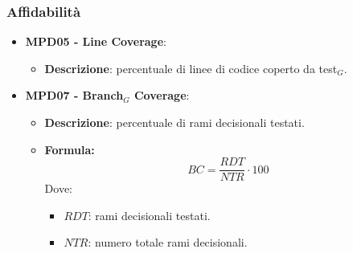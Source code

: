 \documentclass[10pt]{article}
\begin{document}
\begin{justify}
\subsubsection{Affidabilità}
\begin{itemize}
    \item \textbf{MPD05 - Line Coverage}:
    \begin{itemize}
        \item \textbf{Descrizione}: percentuale di linee di codice coperto da test$_G$.
    \end{itemize}

    \item \textbf{MPD07 - Branch$_G$ Coverage}:
    \begin{itemize}
        \item   \textbf{Descrizione}: percentuale di rami decisionali testati.
        \item   \textbf{Formula:}
            \[
            BC = \frac{RDT}{NTR} \cdot 100
            \]
            Dove:
            \begin{itemize}
                \item $RDT$: rami decisionali testati.
                \item $NTR$: numero totale rami decisionali.
            \end{itemize}
    \end{itemize}



\end{itemize}
\end{justify}
\end{document}
